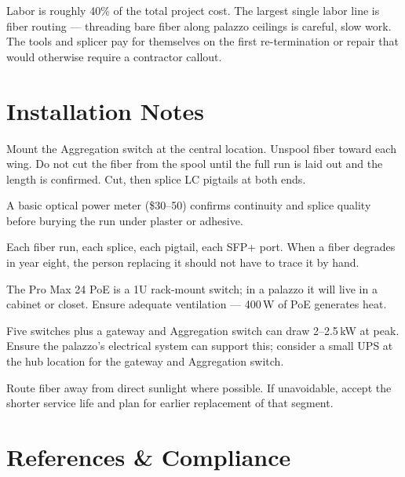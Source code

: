 \documentclass[]{anvil-proposal}
\begin{document}
Labor is roughly 40\% of the total project cost. The largest single labor line is fiber routing --- threading bare fiber along palazzo ceilings is careful, slow work. The tools and splicer pay for themselves on the first re-termination or repair that would otherwise require a contractor callout.

\section{Installation Notes}

\begin{description}[style=nextline, leftmargin=0.6em, itemsep=0.5em]
  \item[Start from the hub outward.] Mount the Aggregation switch at the central location. Unspool fiber toward each wing. Do not cut the fiber from the spool until the full run is laid out and the length is confirmed. Cut, then splice LC pigtails at both ends.
  \item[Test each run before moving on.] A basic optical power meter (\$30--50) confirms continuity and splice quality before burying the run under plaster or adhesive.
  \item[Label everything.] Each fiber run, each splice, each pigtail, each SFP+ port. When a fiber degrades in year eight, the person replacing it should not have to trace it by hand.
  \item[Hide the switches.] The Pro Max 24 PoE is a 1U rack-mount switch; in a palazzo it will live in a cabinet or closet. Ensure adequate ventilation --- 400\,W of PoE generates heat.
  \item[Power considerations.] Five switches plus a gateway and Aggregation switch can draw 2--2.5\,kW at peak. Ensure the palazzo's electrical system can support this; consider a small UPS at the hub location for the gateway and Aggregation switch.
  \item[UV exposure.] Route fiber away from direct sunlight where possible. If unavoidable, accept the shorter service life and plan for earlier replacement of that segment.
\end{description}

\section{References \& Compliance}
\end{document}
